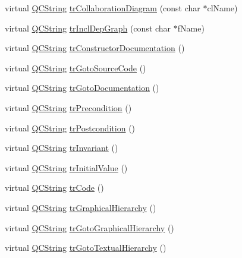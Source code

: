 \begin{DoxyCompactItemize}
\item 
virtual \hyperlink{class_q_c_string}{Q\+C\+String} \hyperlink{class_translator_portuguese_a389d0468eeda3d5b7fb6bd8df4687c20}{tr\+Collaboration\+Diagram} (const char $\ast$cl\+Name)
\item 
virtual \hyperlink{class_q_c_string}{Q\+C\+String} \hyperlink{class_translator_portuguese_ad46a07d2fef1865f23f4b907165d1213}{tr\+Incl\+Dep\+Graph} (const char $\ast$f\+Name)
\item 
virtual \hyperlink{class_q_c_string}{Q\+C\+String} \hyperlink{class_translator_portuguese_abb2958599bd47aba650c23dbbbd4e564}{tr\+Constructor\+Documentation} ()
\item 
virtual \hyperlink{class_q_c_string}{Q\+C\+String} \hyperlink{class_translator_portuguese_aee5a037f1d16cfb8040339866c4b5150}{tr\+Goto\+Source\+Code} ()
\item 
virtual \hyperlink{class_q_c_string}{Q\+C\+String} \hyperlink{class_translator_portuguese_a4a080b1b7f549db556044b03abaf6015}{tr\+Goto\+Documentation} ()
\item 
virtual \hyperlink{class_q_c_string}{Q\+C\+String} \hyperlink{class_translator_portuguese_ae309c4296630e24e78bb495e86e5f0ea}{tr\+Precondition} ()
\item 
virtual \hyperlink{class_q_c_string}{Q\+C\+String} \hyperlink{class_translator_portuguese_aadf8e6533da576d7a33745f35a2a68f2}{tr\+Postcondition} ()
\item 
virtual \hyperlink{class_q_c_string}{Q\+C\+String} \hyperlink{class_translator_portuguese_a97df3abf4bebd252fb4369418d01ea31}{tr\+Invariant} ()
\item 
virtual \hyperlink{class_q_c_string}{Q\+C\+String} \hyperlink{class_translator_portuguese_a500c0b21a92bf7c6c3e7fc6a5a55fc7e}{tr\+Initial\+Value} ()
\item 
virtual \hyperlink{class_q_c_string}{Q\+C\+String} \hyperlink{class_translator_portuguese_a127bc0fed927b35fe141bee2793f2c78}{tr\+Code} ()
\item 
virtual \hyperlink{class_q_c_string}{Q\+C\+String} \hyperlink{class_translator_portuguese_a3b649dcd8c120e65b7f9c9105b4580dd}{tr\+Graphical\+Hierarchy} ()
\item 
virtual \hyperlink{class_q_c_string}{Q\+C\+String} \hyperlink{class_translator_portuguese_a99af93ba73c18c9f2a3c6bf4746f22ef}{tr\+Goto\+Graphical\+Hierarchy} ()
\item 
virtual \hyperlink{class_q_c_string}{Q\+C\+String} \hyperlink{class_translator_portuguese_a9abd8635d3ef33e2650c1b45d6e015a1}{tr\+Goto\+Textual\+Hierarchy} ()

\end{DoxyCompactItemize}
